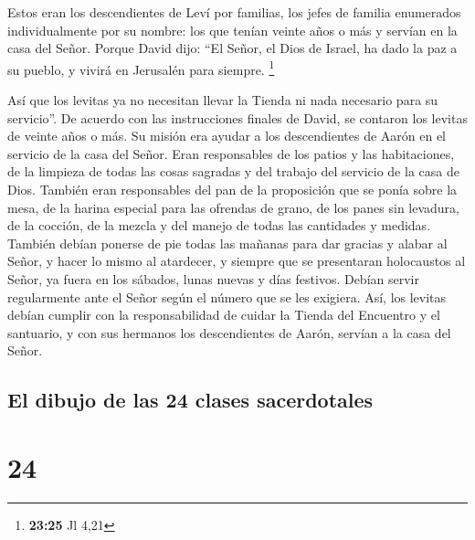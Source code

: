 Estos eran los descendientes de Leví por familias, los
jefes de familia enumerados individualmente por su nombre: los que
tenían veinte años o más y servían en la casa del Señor. 
Porque David dijo: ``El Señor, el Dios de Israel, ha dado la paz a su
pueblo, y vivirá en Jerusalén para siempre. \footnote{\textbf{23:25} Jl
  4,21}

 Así que los levitas ya no necesitan llevar la Tienda ni
nada necesario para su servicio''.  De acuerdo con las
instrucciones finales de David, se contaron los levitas de veinte años o
más.  Su misión era ayudar a los descendientes de Aarón
en el servicio de la casa del Señor. Eran responsables de los patios y
las habitaciones, de la limpieza de todas las cosas sagradas y del
trabajo del servicio de la casa de Dios.  También eran
responsables del pan de la proposición que se ponía sobre la mesa, de la
harina especial para las ofrendas de grano, de los panes sin levadura,
de la cocción, de la mezcla y del manejo de todas las cantidades y
medidas.  También debían ponerse de pie todas las mañanas
para dar gracias y alabar al Señor, y hacer lo mismo al atardecer,
 y siempre que se presentaran holocaustos al Señor, ya
fuera en los sábados, lunas nuevas y días festivos. Debían servir
regularmente ante el Señor según el número que se les exigiera.
 Así, los levitas debían cumplir con la responsabilidad
de cuidar la Tienda del Encuentro y el santuario, y con sus hermanos los
descendientes de Aarón, servían a la casa del Señor.

\hypertarget{el-dibujo-de-las-24-clases-sacerdotales}{%
\subsection{El dibujo de las 24 clases
sacerdotales}\label{el-dibujo-de-las-24-clases-sacerdotales}}

\hypertarget{section-23}{%
\section{24}\label{section-23}}


